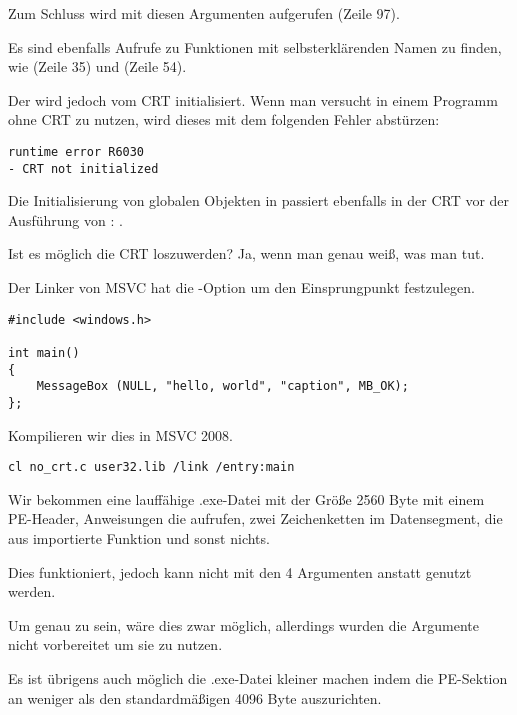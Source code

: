 Zum Schluss wird \main{} mit diesen Argumenten aufgerufen (Zeile 97).

Es sind ebenfalls Aufrufe zu Funktionen mit selbsterklärenden Namen zu finden, wie 
(Zeile 35) und  (Zeile 54).

Der  wird jedoch vom \ac{CRT} initialisiert.
Wenn man versucht  in einem Programm ohne CRT zu nutzen, wird dieses mit dem folgenden
Fehler abstürzen:

\begin{lstlisting}
runtime error R6030
- CRT not initialized
\end{lstlisting}

Die Initialisierung von globalen Objekten in \Cpp passiert ebenfalls in der \ac{CRT} vor der
Ausführung von \main{}:
.


Ist es möglich die \ac{CRT} loszuwerden?
Ja, wenn man genau weiß, was man tut.

Der Linker von \ac{MSVC} hat die -Option um den Einsprungpunkt festzulegen.

\begin{lstlisting}
#include <windows.h>

int main()
{
	MessageBox (NULL, "hello, world", "caption", MB_OK);
};
\end{lstlisting}

Kompilieren wir dies in MSVC 2008.

\begin{lstlisting}
cl no_crt.c user32.lib /link /entry:main
\end{lstlisting}

Wir bekommen eine lauffähige .exe-Datei mit der Größe 2560 Byte mit einem PE-Header,
Anweisungen die  aufrufen, zwei Zeichenketten im Datensegment, die aus
 importierte Funktion  und sonst nichts.

Dies funktioniert, jedoch kann nicht  mit den 4 Argumenten anstatt \main{}
genutzt werden.

Um genau zu sein, wäre dies zwar möglich, allerdings wurden die Argumente nicht vorbereitet
um sie zu nutzen.

Es ist übrigens auch möglich die .exe-Datei kleiner machen indem die \ac{PE}-Sektion
an weniger als den standardmäßigen 4096 Byte auszurichten.

